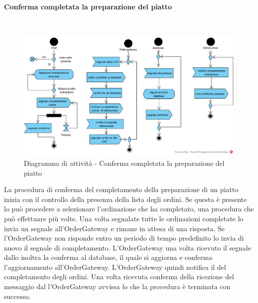 \paragraph{Conferma completata la preparazione del piatto}\mbox{}\\
\nopagebreak
\begin{figure}[H]
	\centering
	\includegraphics[width=14cm]{diagrammi_img/attivita/chef_comlete_order.png}
\caption{Diagramma di attività - Conferma completata la preparazione del piatto}
\end{figure}
La procedura di conferma del completamento della preparazione di un piatto inizia con il controllo della presenza della lista degli ordini. Se questa è presente lo \Chef{} può procedere a selezionare l'ordinazione che ha completato, una procedura che può effettuare più volte. Una volta segnalate tutte le ordinazioni completate lo \Chef{} invia un segnale all'OrderGateway e rimane in attesa di una risposta. Se l'OrderGateway non risponde entro un periodo di tempo predefinito lo \Chef{} invia di nuovo il segnale di completamento. L'OrderGateway una volta ricevuto il segnale dallo \Chef{} inoltra la conferma al database, il quale si aggiorna e conferma l'aggiornamento all'OrderGateway. L'OrderGateway quindi notifica il \Deliveryman{} del completamento degli ordini. Una volta ricevuta conferma della ricezione del messaggio dal \Deliveryman{} l'OrderGateway avvissa lo \Chef{} che la procedura è terminata con successo.

